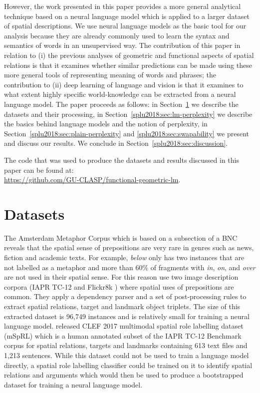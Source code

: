  However, the work presented in this paper provides a more general
 analytical technique based on a neural language model
 \cite{bengio2003neural,mikolov2010recurrent} which is applied to a
 larger dataset of spatial descriptions. 
 We use neural language models as the basic tool for our analysis because
 they are already commonly used to learn the syntax and semantics of
 words in an unsupervised way.
 The contribution of
 this paper in relation to (i) the previous analyses of geometric and
 functional aspects of spatial relations is that it examines whether
 similar predictions can be made using these more general tools of
 representing meaning of words and phrases; the contribution to (ii)
 deep learning of language and vision is that it examines to what
 extent highly specific world-knowledge can be extracted from a
 neural language model. The paper proceeds as follows: in
 Section~\ref{splu2018:sec:dataset} we describe the datasets and their
 processing, in Section~\ref{splu2018:sec:lm-perplexity} we describe the basics
 behind language models and the notion of perplexity, in
 Section~\ref{splu2018:sec:plain-perplexity} and \ref{splu2018:sec:swapability} we
 present and discuss our results. We conclude in
 Section~\ref{splu2018:sec:discussion}.

 The code that was used to produce the datasets and results discussed
 in this paper can be found at: \\
 \url{https://github.com/GU-CLASP/functional-geometric-lm}.
 






\section{Datasets}\label{splu2018:sec:dataset}

The Amsterdam Metaphor Corpus \cite{Steen:2010aa} which is based on a subsection of a BNC reveals that the spatial sense of prepositions are very rare in genres such as news, fiction and academic texts. For example, \emph{below} only has two instances that are not labelled as a metaphor and more than 60\% of fragments with \emph{in}, \emph{on}, and \emph{over} are not used in their spatial sense. %
For this reason \citet{Dobnik:2013aa} use %
two image description corpora (IAPR TC-12 \cite{Grubinger:2006uq} and
Flickr8k \cite{Rashtchian:2010kx}) where spatial uses of prepositions are common.  They apply a dependency parser and a set of post-processing rules to extract spatial relations, target and landmark object triplets. %
The size of this extracted dataset is 96,749 instances %
and is relatively small for training a neural language model. %
\cite{Kordjamshidi:2017ab} released CLEF 2017 multimodal spatial role labelling dataset (mSpRL) which is a human annotated subset of the IAPR TC-12 Benchmark corpus for spatial relations, targets and landmarks \cite{Kordjamshidi:2011aa} containing 613 text files and 1,213 sentences. While this dataset could not be used to train a language model directly, a spatial role labelling classifier could be trained on it to identify spatial relations and arguments which would then be used to produce a bootstrapped dataset for training a neural language model.


